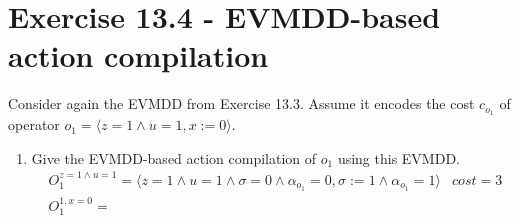 \documentclass[11pt,a4paper]{article}
\begin{document}
\section*{Exercise 13.4 - EVMDD-based action compilation}
Consider again the EVMDD from Exercise 13.3. Assume it encodes the cost $c_{o_1}$ of operator $o_1 = \langle z = 1 \land u = 1, x := 0\rangle$.

\begin{enumerate}[label=\alph*)]
	\item Give the EVMDD-based action compilation of $o_1$ using this EVMDD.
	\begin{align*}
		&O_1^{z=1 \land u=1} = \langle z = 1 \land u = 1 \land \sigma = 0 \land \alpha_{o_1} = 0, \sigma := 1 \land \alpha_{o_1} = 1\rangle & cost=3&\\
		&O_1^{1, x=0} = 
	\end{align*}
\end{enumerate}
\end{document}
